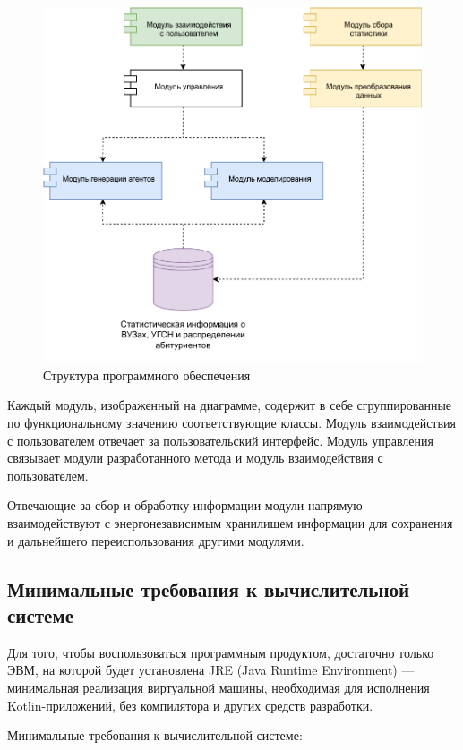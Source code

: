 \begin{figure}[hbtp]
	\centering
	\includegraphics[scale=1.1]{img/developed.drawio.pdf}
	\caption{Структура программного обеспечения}
	\label{developed}
\end{figure}

Каждый модуль, изображенный на диаграмме, содержит в себе
сгруппированные по функциональному значению соответствующие классы.
Модуль взаимодействия с пользователем отвечает за пользовательский
интерфейс. Модуль управления связывает модули разработанного метода и модуль взаимодействия с пользователем. 

Отвечающие за сбор и обработку информации модули напрямую взаимодействуют с энергонезависимым хранилищем информации для сохранения и дальнейшего переиспользования другими модулями.

\subsection{Минимальные требования к вычислительной системе}

Для того, чтобы воспользоваться программным продуктом, достаточно только ЭВМ, на которой будет установлена JRE (Java Runtime Environment) — минимальная реализация виртуальной машины, необходимая для исполнения Kotlin-приложений, без компилятора и других средств разработки.

Минимальные требования к вычислительной системе:

